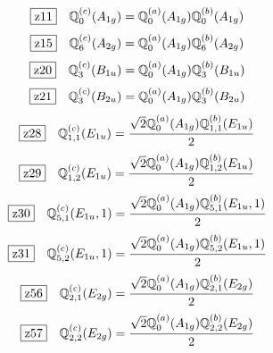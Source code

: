 \documentclass[fleqn,10pt,landscape]{jsarticle}
\begin{document}
\begin{dmath*}
\hspace*{3mm}\fbox{z11}\quad \mathbb{Q}_{0}^{(c)}(A_{1g})=\mathbb{Q}_{0}^{(a)}(A_{1g}) \mathbb{Q}_{0}^{(b)}(A_{1g})
\end{dmath*}
\begin{dmath*}
\hspace*{3mm}\fbox{z15}\quad \mathbb{Q}_{6}^{(c)}(A_{2g})=\mathbb{Q}_{0}^{(a)}(A_{1g}) \mathbb{Q}_{6}^{(b)}(A_{2g})
\end{dmath*}
\begin{dmath*}
\hspace*{3mm}\fbox{z20}\quad \mathbb{Q}_{3}^{(c)}(B_{1u})=\mathbb{Q}_{0}^{(a)}(A_{1g}) \mathbb{Q}_{3}^{(b)}(B_{1u})
\end{dmath*}
\begin{dmath*}
\hspace*{3mm}\fbox{z21}\quad \mathbb{Q}_{3}^{(c)}(B_{2u})=\mathbb{Q}_{0}^{(a)}(A_{1g}) \mathbb{Q}_{3}^{(b)}(B_{2u})
\end{dmath*}
\begin{dmath*}
\hspace*{3mm}\fbox{z28}\quad \mathbb{Q}_{1,1}^{(c)}(E_{1u})=\frac{\sqrt{2} \mathbb{Q}_{0}^{(a)}(A_{1g}) \mathbb{Q}_{1,1}^{(b)}(E_{1u})}{2}
\end{dmath*}
\begin{dmath*}
\hspace*{3mm}\fbox{z29}\quad \mathbb{Q}_{1,2}^{(c)}(E_{1u})=\frac{\sqrt{2} \mathbb{Q}_{0}^{(a)}(A_{1g}) \mathbb{Q}_{1,2}^{(b)}(E_{1u})}{2}
\end{dmath*}
\begin{dmath*}
\hspace*{3mm}\fbox{z30}\quad \mathbb{Q}_{5,1}^{(c)}(E_{1u},1)=\frac{\sqrt{2} \mathbb{Q}_{0}^{(a)}(A_{1g}) \mathbb{Q}_{5,1}^{(b)}(E_{1u},1)}{2}
\end{dmath*}
\begin{dmath*}
\hspace*{3mm}\fbox{z31}\quad \mathbb{Q}_{5,2}^{(c)}(E_{1u},1)=\frac{\sqrt{2} \mathbb{Q}_{0}^{(a)}(A_{1g}) \mathbb{Q}_{5,2}^{(b)}(E_{1u},1)}{2}
\end{dmath*}
\begin{dmath*}
\hspace*{3mm}\fbox{z56}\quad \mathbb{Q}_{2,1}^{(c)}(E_{2g})=\frac{\sqrt{2} \mathbb{Q}_{0}^{(a)}(A_{1g}) \mathbb{Q}_{2,1}^{(b)}(E_{2g})}{2}
\end{dmath*}
\begin{dmath*}
\hspace*{3mm}\fbox{z57}\quad \mathbb{Q}_{2,2}^{(c)}(E_{2g})=\frac{\sqrt{2} \mathbb{Q}_{0}^{(a)}(A_{1g}) \mathbb{Q}_{2,2}^{(b)}(E_{2g})}{2}
\end{dmath*}
\end{document}
